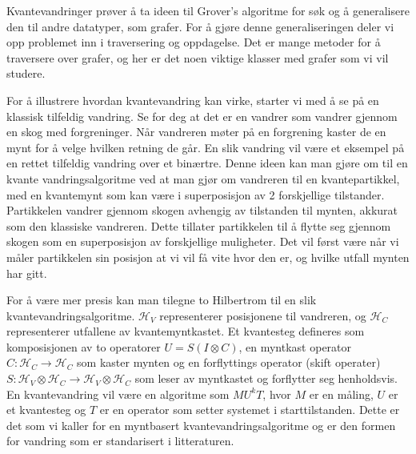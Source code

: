    Kvantevandringer prøver å ta ideen til Grover's algoritme for søk og å generalisere den til andre datatyper, som grafer. For å gjøre denne generaliseringen deler vi opp problemet inn i traversering og oppdagelse. Det er mange metoder for å traversere over grafer, og her er det noen viktige klasser med grafer som vi vil studere.



    For å illustrere hvordan kvantevandring kan virke, starter vi med å se på en klassisk tilfeldig vandring. Se for deg at det er en vandrer som vandrer gjennom en skog med forgreninger. Når vandreren møter på en forgrening kaster de en mynt for å velge hvilken retning de går. En slik vandring vil være et eksempel på en rettet tilfeldig vandring over et binærtre. Denne ideen kan man gjøre om til en kvante vandringsalgoritme ved at man gjør om vandreren til en kvantepartikkel, med en kvantemynt som kan være i superposisjon av 2 forskjellige tilstander. Partikkelen vandrer gjennom skogen avhengig av tilstanden til mynten, akkurat som den klassiske vandreren. Dette tillater partikkelen til å flytte seg gjennom skogen som en superposisjon av forskjellige muligheter. Det vil først være når vi måler partikkelen sin posisjon at vi vil få vite hvor den er, og hvilke utfall mynten har gitt.

    For å være mer presis kan man tilegne to Hilbertrom til en slik kvantevandringsalgoritme. $\mathcal{H}_V$ representerer posisjonene til vandreren, og $\mathcal{H}_C$ representerer utfallene av kvantemyntkastet. Et kvantesteg defineres som komposisjonen av to operatorer $U=S(I\otimes C)$, en myntkast operator $C:\mathcal{H}_C\rightarrow\mathcal{H}_C$ som kaster mynten og en forflyttings operator (skift operater) $S:\mathcal{H}_V\otimes\mathcal{H}_C\rightarrow\mathcal{H}_V\otimes\mathcal{H}_C$ som leser av myntkastet og forflytter seg henholdsvis. En kvantevandring vil være en algoritme som $MU^kT$, hvor $M$ er en måling, $U$ er et kvantesteg og $T$ er en operator som setter systemet i starttilstanden. Dette er det som vi kaller for en myntbasert kvantevandringsalgoritme og er den formen for vandring som er standarisert i litteraturen.


